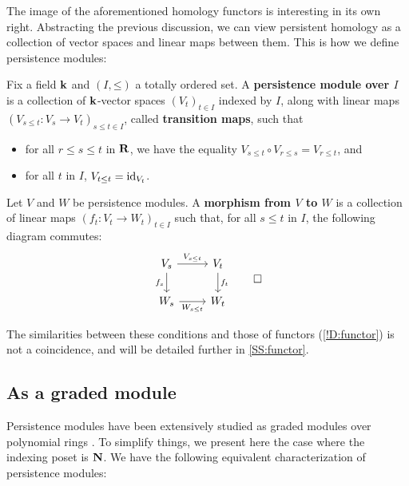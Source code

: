 The image of the aforementioned homology functors is interesting in its own right. Abstracting the previous discussion, we can view persistent homology as a collection of vector spaces and linear maps between them. This is how we define persistence modules:

\begin{definition}
\label{!D:persistence-module}
  Fix a field $\mathbf{k}$ and $(I, \mathord{\leq})$ a totally ordered set. A \textbf{persistence module over $I$} is a collection of $\mathbf{k}$-vector spaces $(V_t)_{t \in I}$ indexed by $I$, along with linear maps $(V_{s \leq t} \colon V_s \to V_t)_{s \leq t \in I}$, called \textbf{transition maps}, such that
  \begin{itemize}
    \item for all $r \leq s \leq t$ in $\mathbf{R}$, we have the equality $V_{s \leq t} \circ V_{r \leq s} = V_{r \leq t}$, and
    \item for all $t$ in $I$, $V_{t \leq t} = \operatorname{id}_{V_t}$.
  \end{itemize}
  Let $V$ and $W$ be persistence modules. A \textbf{morphism from $V$ to $W$} is a collection of linear maps $(f_t \colon V_t \to W_t)_{t \in I}$ such that, for all $s \leq t$ in $I$, the following diagram commutes:
  \begin{equation}
  \label{Eq:persistence-module-morphism-commute}
    \begin{tikzcd}
      V_s
        \arrow[r, "V_{s \leq t}"]
        \arrow[d, "f_s" swap]
      & V_t
        \arrow[d, "f_t"]
    \\
      W_s
        \arrow[r, "W_{s \leq t}" swap]
      & W_t
    \end{tikzcd}
    \qedhere
  \end{equation}
\end{definition}

The similarities between these conditions and those of functors (\cref{!D:functor}) is not a coincidence, and will be detailed further in \cref{SS:functor}.

\subsection{As a graded module}
\label{SS:graded-module}

Persistence modules have been extensively studied as graded modules over polynomial rings \cite{CorbetKerber2018,Miller2026,ZomorodianCarlsson2005}. To simplify things, we present here the case where the indexing poset is $\mathbf{N}$. We have the following equivalent characterization of persistence modules:

